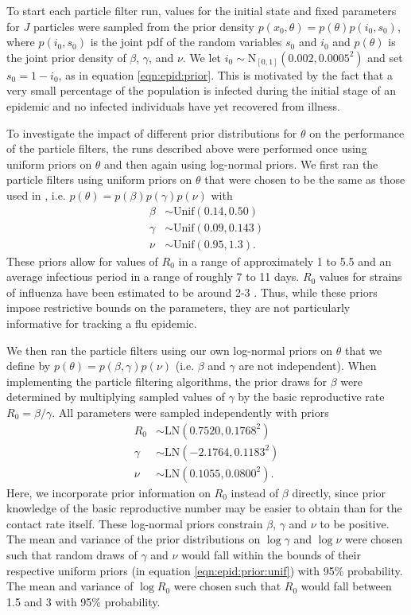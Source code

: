 To start each particle filter run, values for the initial state and fixed parameters for $J$ particles were sampled from the prior density $p(x_0,\theta) = p(\theta)p(i_0,s_0)$, where $p(i_0,s_0)$ is the joint pdf of the random variables $s_0$ and $i_0$ and $p(\theta)$ is the joint prior density of $\beta$, $\gamma$, and $\nu$. We let $i_0 \sim \mbox{N}_{[0,1]}(0.002,0.0005^2)$ and set $s_0 = 1 - i_0$, as in equation \eqref{eqn:epid:prior}. This is motivated by the fact that a very small percentage of the population is infected during the initial stage of an epidemic and no infected individuals have yet recovered from illness.

To investigate the impact of different prior distributions for $\theta$ on the performance of the particle filters, the runs described above were performed once using uniform priors on $\theta$ and then again using log-normal priors. We first ran the particle filters using uniform priors on $\theta$ that were chosen to be the same as those used in \citet{skvortsov2012monitoring}, i.e. $p(\theta) = p(\beta)p(\gamma)p(\nu)$ with
\begin{align}
\beta &\sim \mbox{Unif}(0.14, 0.50) \label{eqn:epid:prior:unif} \\
\gamma &\sim \mbox{Unif}(0.09, 0.143) \nonumber \\
\nu &\sim \mbox{Unif}(0.95, 1.3). \nonumber
\end{align}
These priors allow for values of $R_0$ in a range of approximately 1 to 5.5 and an average infectious period in a range of roughly 7 to 11 days. $R_0$ values for strains of influenza have been estimated to be around 2-3 \citep{mills2004influenza, heff2005repratio, zhang2011flu}. Thus, while these priors impose restrictive bounds on the parameters, they are not particularly informative for tracking a flu epidemic.

We then ran the particle filters using our own log-normal priors on $\theta$ that we define by $p(\theta) = p(\beta, \gamma)p(\nu)$ (i.e. $\beta$ and $\gamma$ are not independent). When implementing the particle filtering algorithms, the prior draws for $\beta$ were determined by multiplying sampled values of $\gamma$ by the basic reproductive rate $R_0 = \beta / \gamma$. All parameters were sampled independently with priors
\begin{align}
R_0 &\sim \mbox{LN}(0.7520, 0.1768^2) \label{eqn:epid:prior:ln} \\
\gamma &\sim \mbox{LN}(-2.1764, 0.1183^2) \nonumber \\
\nu &\sim \mbox{LN}(0.1055, 0.0800^2). \nonumber
\end{align}
Here, we incorporate prior information on $R_0$ instead of $\beta$ directly, since prior knowledge of the basic reproductive number may be easier to obtain than for the contact rate itself. These log-normal priors constrain $\beta$, $\gamma$ and $\nu$ to be positive. The mean and variance of the prior distributions on $\log \gamma$ and $\log \nu$ were chosen such that random draws of $\gamma$ and $\nu$ would fall within the bounds of their respective uniform priors (in equation \eqref{eqn:epid:prior:unif}) with 95\% probability. The mean and variance of $\log R_0$ were chosen such that $R_0$ would fall between 1.5 and 3 with 95\% probability.

